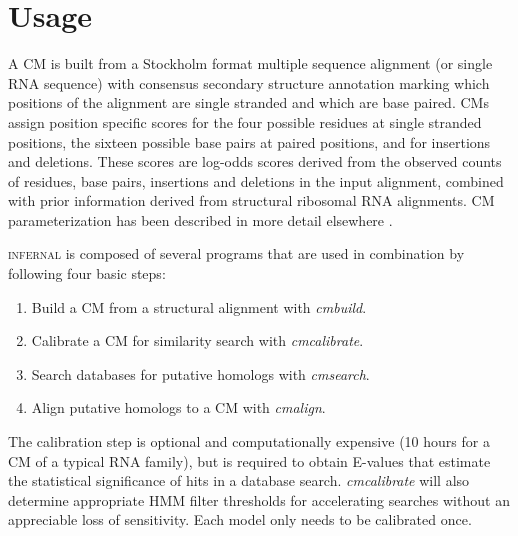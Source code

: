
\section{Usage} 

A CM is built from a Stockholm format \citep{infguide03} multiple
sequence alignment (or single RNA sequence) with consensus secondary
structure annotation marking which positions of the alignment are
single stranded and which are base paired. CMs assign position
specific scores for the four possible residues at single stranded
positions, the sixteen possible base pairs at paired positions, and
for
insertions and deletions. These scores are log-odds scores derived
from the observed counts of residues, base pairs, insertions and
deletions in the input alignment, combined with prior information
derived from structural ribosomal RNA alignments. 
CM parameterization has been described in more detail elsewhere
\citep{Eddy94,Eddy02b,infguide03,NawrockiEddy07}.

\textsc{infernal} is composed of several programs that are used in
combination %
by following four basic steps: 
\begin{enumerate}
\item Build a CM from a structural alignment with \emph{cmbuild}.
\item Calibrate a CM for similarity search with \emph{cmcalibrate}.
\item Search databases for putative homologs with \emph{cmsearch}.
\item Align putative homologs to a CM with \emph{cmalign}.
\end{enumerate}


The calibration step is optional and computationally expensive (10
hours for a CM of a typical RNA family), but is required to obtain
E-values that estimate the statistical significance of hits in a
database search. \emph{cmcalibrate} will also determine appropriate
HMM filter thresholds for accelerating searches without an appreciable
loss of sensitivity. Each model only needs to be calibrated once.

\begin{comment}
(1) \textbf{Build} a CM from a structural alignment with \emph{cmbuild}. 
(2) \textbf{Calibrate} a CM for similarity search with \emph{cmcalibrate}.
(3) \textbf{Search} databases for putative homologs to a CM with \emph{cmsearch}.
(4) \textbf{Align} putative homologs to a CM with \emph{cmalign}.
\end{comment}

